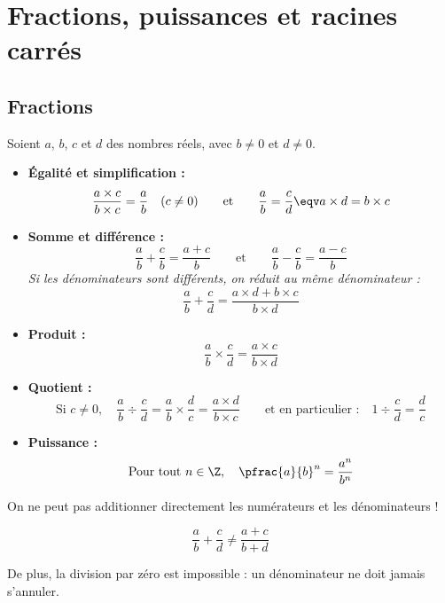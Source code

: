 \chapter{Fractions, puissances et racines carrés}

\section{Fractions}

\begin{prop}
	Soient $a$, $b$, $c$ et $d$ des nombres réels, avec $b \neq 0$ et $d \neq 0$.

	\begin{itemize}
		\item \textbf{Égalité et simplification :}
		      \[
			      \frac{a \times c}{b \times c} = \frac{a}{b} \quad (c \neq 0) \qquad \text{et} \qquad \frac{a}{b} = \frac{c}{d} \eqv a \times d = b \times c
		      \]

		\item \textbf{Somme et différence :}
		      \[
			      \frac{a}{b} + \frac{c}{b} = \frac{a + c}{b} \qquad \text{et} \qquad \frac{a}{b} - \frac{c}{b} = \frac{a - c}{b}
		      \]
		      \textit{Si les dénominateurs sont différents, on réduit au même dénominateur :}
		      \[
			      \frac{a}{b} + \frac{c}{d} = \frac{a \times d + b \times c}{b \times d}
		      \]

		\item \textbf{Produit :}
		      \[
			      \frac{a}{b} \times \frac{c}{d} = \frac{a \times c}{b \times d}
		      \]

		\item \textbf{Quotient :}
		      \[
			      \text{Si } c \neq 0, \quad \dfrac{a}{b} \div \dfrac{c}{d} = \frac{a}{b} \times \frac{d}{c} = \frac{a \times d}{b \times c} \qquad \text{et en particulier :} \quad 1 \div \dfrac{c}{d} = \frac{d}{c}
		      \]

		\item \textbf{Puissance :}
		      \[
			      \text{Pour tout } n \in \Z, \quad \pfrac{a}{b}^n = \frac{a^n}{b^n}
		      \]
	\end{itemize}
\end{prop}

\begin{attention}
	On ne peut pas additionner directement les numérateurs et les dénominateurs !

	\[
		\frac{a}{b} + \frac{c}{d} \neq \frac{a + c}{b + d}
	\]

	De plus, la division par zéro est impossible : un dénominateur ne doit jamais s'annuler.
\end{attention}

